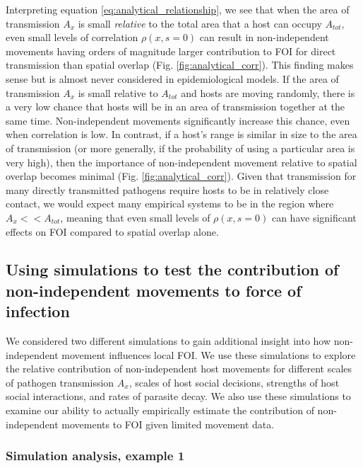 \documentclass[letterpaper]{article}
\begin{document}
Interpreting equation \ref{eq:analytical_relationship}, we see that when the area of transmission $A_x$ is small \emph{relative} to the total area that a host can occupy $A_{tot}$, even small levels of correlation $\rho(x, s=0)$ can result in non-independent movements having orders of magnitude larger contribution to FOI for direct transmission than spatial overlap (Fig. \ref{fig:analytical_corr}). This finding makes sense but is almost never considered in epidemiological models. If the area of transmission $A_x$ is small relative to $A_{tot}$ and hosts are moving randomly, there is a very low chance that hosts will be in an area of transmission together at the same time. Non-independent movements significantly increase this chance, even when correlation is low. In contrast, if a host's range is similar in size to the area of transmission (or more generally, if the probability of using a particular area is very high), then the importance of non-independent movement relative to spatial overlap becomes minimal (Fig. \ref{fig:analytical_corr}).  Given that transmission for many directly transmitted pathogens require hosts to be in relatively close contact, we would expect many empirical systems to be in the region where $A_x << A_{tot}$, meaning that even small levels of $\rho(x, s=0)$ can have significant effects on FOI compared to spatial overlap alone. 

\subsection*{Using simulations to test the contribution of non-independent movements to force of infection}

We considered two different simulations to gain additional insight into how non-independent movement influences local FOI. We use these simulations to explore the relative contribution of non-independent host movements for different scales of pathogen transmission $A_x$, scales of host social decisions, strengths of host social interactions, and rates of parasite decay.  We also use these simulations to examine our ability to actually empirically estimate the contribution of non-independent movements to FOI given limited movement data.

\subsubsection*{Simulation analysis, example 1}
\end{document}
